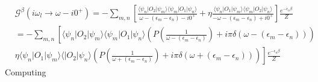 \documentclass[a4paper,11pt]{article}
\begin{document}
\begin{equation*}
  \begin{split}
     &\mathcal{G}^\beta(i\omega_l\rightarrow\omega-i0^+)=-\sum_{m,n}\left[\frac{\langle\psi_n|O_2|\psi_m\rangle\langle\psi_m|O_1|\psi_n\rangle}{\omega-(\epsilon_m-\epsilon_n)-i0^+}+\eta\frac{\langle\psi_n|O_1|\psi_m\rangle\langle\psi_m|O_2|\psi_n\rangle}{-\omega-(\epsilon_m-\epsilon_n)+i0^+}\right]\frac{e^{-\epsilon_n\beta}}{Z}\\
       &=-\sum_{m,n}\left[\langle\psi_n|O_2|\psi_m\rangle\langle\psi_m|O_1|\psi_n\rangle\left(P\left(\frac{1}{\omega-(\epsilon_m-\epsilon_n)}\right)+i\pi\delta(\omega-(\epsilon_m-\epsilon_n))\right)\right.\\
       &\left.\eta\langle\psi_n|O_1|\psi_m\rangle\langle|O_2|\psi_n\rangle\left(P\left(\frac{1}{\omega+(\epsilon_m-\epsilon_n)}\right)+i\pi\delta(\omega+(\epsilon_m-\epsilon_n))\right)\right]\frac{e^{-\epsilon_n\beta}}{Z}
  \end{split}
\end{equation*}
Computing
\end{document}
